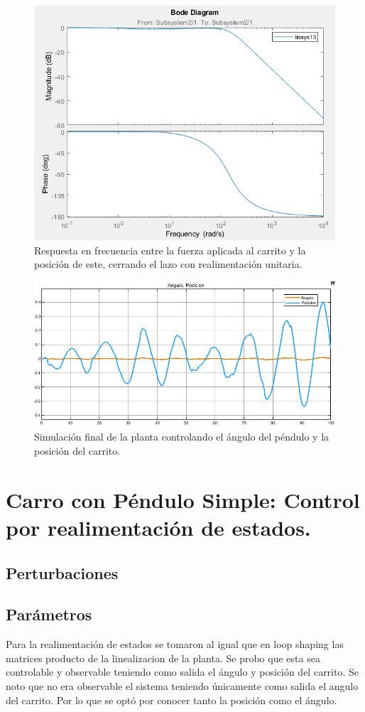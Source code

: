 \begin{figure}[H]
	\centering
	\includegraphics[width=0.8\linewidth]{Imagenes/bode_cerrando_p}
	\caption{Respuesta en frecuencia entre la fuerza aplicada al carrito y la posición de este, cerrando el lazo con realimentación unitaria.}
	\label{bode_cerrando_p}
\end{figure}


\begin{figure}[H]
	\centering
	\includegraphics[width=0.8\linewidth]{Imagenes/simulacion_final}
	\caption{Simulación final de la planta controlando el ángulo del péndulo y la posición del carrito.}
	\label{simulacion_solo_angulo}
\end{figure}
\section{Carro con Péndulo Simple: Control por realimentaci\'on de estados.}
\subsection{Perturbaciones}
\subsection{Par\'ametros}
 Para la realimentación de estados se tomaron al igual que en loop shaping las matrices producto de la linealizacion de la planta.
 Se probo que esta sea controlable y observable teniendo como salida el \'angulo y posici\'on del carrito.
 Se noto que no era observable el sistema teniendo únicamente como salida el angulo del carrito. Por lo que se opt\'o por conocer tanto la posici\'on como el \'angulo.
